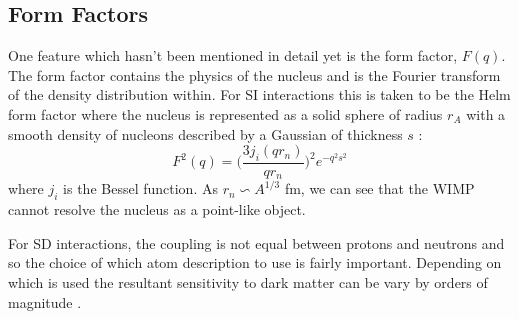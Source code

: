 \subsection{Form Factors}
\label{sec:form_factors}
\par
One feature which hasn't been mentioned in detail yet is the form factor, $F(q)$.
The form factor contains the physics of the nucleus and is the Fourier transform of the density distribution within.
For SI interactions this is taken to be the Helm form factor where the nucleus is represented as a solid sphere of radius $r_A$ with a smooth density of nucleons described by a Gaussian of thickness $s$ \cite{helm_form_factor_ref}:
\begin{equation}
    F^2(q) = \bigg( \frac{3j_i(qr_n)}{qr_n} \bigg)^2 e^{-q^2 s^2}
\end{equation}
where $j_i$ is the Bessel function.
As $r_n \backsim A^{1/3}$ fm, we can see that the WIMP cannot resolve the nucleus as a point-like object.
\par
For SD interactions, the coupling is not equal between protons and neutrons and so the choice of which atom description to use is fairly important.
Depending on which is used the resultant sensitivity to dark matter can be vary by orders of magnitude \cite{wimp_nuclear_model_ref,wimp_sd_form_factor_ref}.